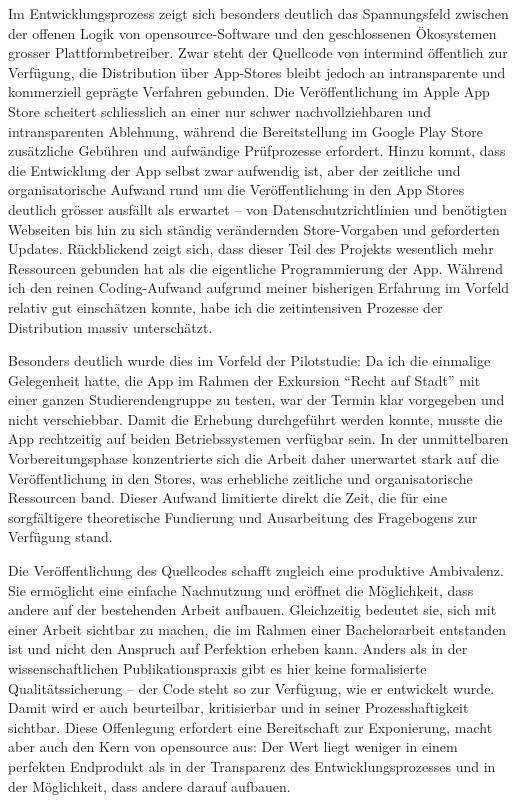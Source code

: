 \vspace{1em}

Im Entwicklungsprozess zeigt sich besonders deutlich das Spannungsfeld zwischen der offenen Logik von \gls{opensource}-Software und den geschlossenen Ökosystemen grosser Plattformbetreiber. Zwar steht der Quellcode von \gls{intermind} öffentlich zur Verfügung, die Distribution über App-Stores bleibt jedoch an intransparente und kommerziell geprägte Verfahren gebunden. Die Veröffentlichung im Apple App Store scheitert schliesslich an einer nur schwer nachvollziehbaren und intransparenten Ablehnung, während die Bereitstellung im Google Play Store zusätzliche Gebühren und aufwändige Prüfprozesse erfordert. Hinzu kommt, dass die Entwicklung der App selbst zwar aufwendig ist, aber der zeitliche und organisatorische Aufwand rund um die Veröffentlichung in den App Stores deutlich grösser ausfällt als erwartet – von Datenschutzrichtlinien und benötigten Webseiten bis hin zu sich ständig verändernden Store-Vorgaben und geforderten Updates. Rückblickend zeigt sich, dass dieser Teil des Projekts wesentlich mehr Ressourcen gebunden hat als die eigentliche Programmierung der App. Während ich den reinen Coding-Aufwand aufgrund meiner bisherigen Erfahrung im Vorfeld relativ gut einschätzen konnte, habe ich die zeitintensiven Prozesse der Distribution massiv unterschätzt.

Besonders deutlich wurde dies im Vorfeld der Pilotstudie: Da ich die einmalige Gelegenheit hatte, die App im Rahmen der Exkursion \enquote{Recht auf Stadt} mit einer ganzen Studierendengruppe zu testen, war der Termin klar vorgegeben und nicht verschiebbar. Damit die Erhebung durchgeführt werden konnte, musste die App rechtzeitig auf beiden Betriebssystemen verfügbar sein. In der unmittelbaren Vorbereitungsphase konzentrierte sich die Arbeit daher unerwartet stark auf die Veröffentlichung in den Stores, was erhebliche zeitliche und organisatorische Ressourcen band. Dieser Aufwand limitierte direkt die Zeit, die für eine sorgfältigere theoretische Fundierung und Ausarbeitung des Fragebogens zur Verfügung stand.

Die Veröffentlichung des Quellcodes schafft zugleich eine produktive Ambivalenz. Sie ermöglicht eine einfache Nachnutzung und eröffnet die Möglichkeit, dass andere auf der bestehenden Arbeit aufbauen. Gleichzeitig bedeutet sie, sich mit einer Arbeit sichtbar zu machen, die im Rahmen einer Bachelorarbeit entstanden ist und nicht den Anspruch auf Perfektion erheben kann. Anders als in der wissenschaftlichen Publikationspraxis gibt es hier keine formalisierte Qualitätssicherung -- der Code steht so zur Verfügung, wie er entwickelt wurde. Damit wird er auch beurteilbar, kritisierbar und in seiner Prozesshaftigkeit sichtbar. Diese Offenlegung erfordert eine Bereitschaft zur Exponierung, macht aber auch den Kern von \gls{opensource} aus: Der Wert liegt weniger in einem perfekten Endprodukt als in der Transparenz des Entwicklungsprozesses und in der Möglichkeit, dass andere darauf aufbauen.

